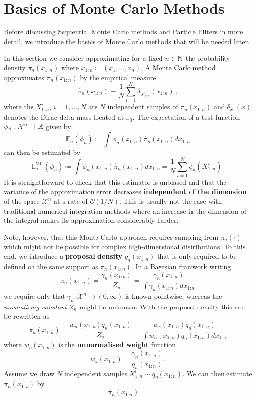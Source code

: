 \documentclass[
fontsize=11pt,
paper=a4,
numbers=noenddot,
parskip=full
]{scrartcl}
\begin{document}
\section*{Basics of Monte Carlo Methods}
Before discussing Sequential Monte Carlo methods and Particle Filters
in more detail, we introduce the basics of Monte Carlo methods that
will be needed later.

In this section we consider approximating for a fixed $n \in \mathbb{N}$ the
probability density $\pi_n(x_{1 : n})$ where
$x_{1:n} \coloneqq (x_1, \dotsc, x_n)$. A Monte Carlo method
approximates $\pi_n(x_{1:n})$ by the empirical measure
\[
  \hat{\pi}_n(x_{1:n}) = \frac{1}{N} \sum_{i = 1}^N
  \delta_{X_{1:n}^i}(x_{1:n})\,,
\]
where the $X_{1:n}^i$, $i = 1, \dotsc, N$ are $N$ independent samples
of $\pi_n(x_{1:n})$ and $\delta_{x_0}(x)$ denotes the Dirac delta mass
located at $x_0$. The expectation of a test function
$\phi_n : \mathcal{X}^n \rightarrow \mathbb{R}$ given by
\[
  \mathbb{E}_n(\phi_n) \coloneqq \int \phi_n(x_{1:n})
  \hat{\pi}_n(x_{1:n}) dx_{1:n}
\]
can then be estimated by
\[
  \mathbb{E}_n^{\text{MC}}(\phi_n) \coloneqq \int \phi_n(x_{1:n})
  \hat{\pi}_n(x_{1:n}) dx_{1:n} = \frac{1}{N} \sum_{i=1}^N
  \phi_n(X_{1:n}^i) \,.
\]
It is straightforward to check that this estimator is unbiased and
that the variance of the approximation error decreases
\textbf{independent of the dimension} of the space $\mathcal{X}^n$ at
a rate of $\mathcal{O}(1/N)$. This is usually not the case with
traditional numerical integration methods where an increase in the
dimension of the integral makes its approximation considerably harder.

Note, however, that this Monte Carlo approach requires sampling from
$\pi_n(\cdot)$ which might not be possible for complex
high-dimensional distributions. To this end, we introduce a
\textbf{proposal density} $q_n(x_{1:n})$ that is only required to be
defined on the same support as $\pi_n(x_{1:n})$. In a Bayesian
framwork writing
\[
  \pi_n(x_{1:n}) = \frac{\gamma_n(x_{1:n})}{Z_n} =
  \frac{\gamma_n(x_{1:n})}{\int \gamma_n(x_{1:n}) dx_{1:n}}
\]
we require only that
$\gamma_n : \mathcal{X}^n \rightarrow (0, \infty)$ is known pointwise,
whereas the \emph{normalising constant} $Z_n$ might be unknown. With
the proposal density this can be rewritten as
\begin{equation}
  \label{eq:is:density}
  \pi_n(x_{1:n}) = \frac{w_n(x_{1:n})q_n(x_{1:n})}{Z_n} = \frac{w_n(x_{1:n})q_n(x_{1:n})}{\int w_n(x_{1:n})q_n(x_{1:n})dx_{1:n}}
\end{equation}
where $w_n(x_{1:n})$ is the \textbf{unnormalised weight} function
\[
  w_n(x_{1:n}) = \frac{\gamma_n(x_{1:n})}{q_n(x_{1:n})}\,.
\]
Assume we draw $N$ independent samples $X_{1:n}^i \sim q_n(x_{1:n})$.
We can then estimate $\pi_n(x_{1:n})$ by
\[
  \hat{\pi}_n(x_{1:n}) = 
\]
\end{document}
